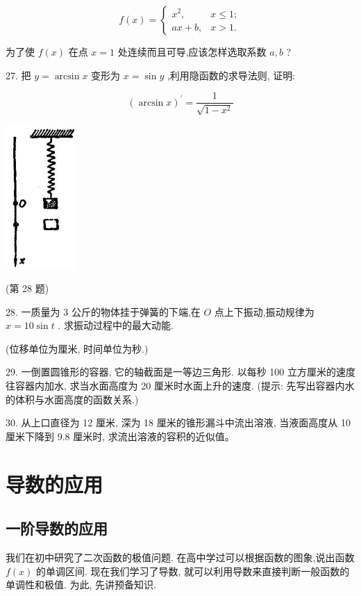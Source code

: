 \documentclass[lang=cn,newtx,10pt,scheme=chinese]{elegantbook}
\begin{document}
\[
f\left( x\right) = \left\{ \begin{array}{ll} {x}^{2}, & x \leq 1; \\ {ax} + b, & x > 1. \end{array}\right.
\]

为了使 \(f\left( x\right)\) 在点 \(x = 1\) 处连续而且可导,应该怎样选取系数 \(a,b\) ?

27. 把 \(y = \arcsin x\) 变形为 \(x = \sin y\) ,利用隐函数的求导法则, 证明:

\[
{\left( \arcsin x\right) }^{\prime } = \frac{1}{\sqrt{1 - {x}^{2}}}
\]

\begin{center}
\includegraphics[max width=0.2\textwidth]{images/01912c18-5c3f-733d-b775-749ba9897a9d_129_320008.jpg}
\end{center}

(第 28 题)

28. 一质量为 3 公斤的物体挂于弹簧的下端,在 \(O\) 点上下振动,振动规律为 \(x = {10}\sin t\) . 求振动过程中的最大动能.

(位移单位为厘米, 时间单位为秒.)

29. 一倒置圆锥形的容器, 它的轴截面是一等边三角形. 以每秒 100 立方厘米的速度往容器内加水, 求当水面高度为 20 厘米时水面上升的速度. (提示: 先写出容器内水的体积与水面高度的函数关系.)

30. 从上口直径为 12 厘米, 深为 18 厘米的锥形漏斗中流出溶液, 当液面高度从 10 厘米下降到 9.8 厘米时, 求流出溶液的容积的近似值。

\chapter{导数的应用}

\section*{一阶导数的应用}

我们在初中研究了二次函数的极值问题. 在高中学过可以根据函数的图象,说出函数 \(f\left( x\right)\) 的单调区间. 现在我们学习了导数, 就可以利用导数来直接判断一般函数的单调性和极值. 为此, 先讲预备知识.
\end{document}
